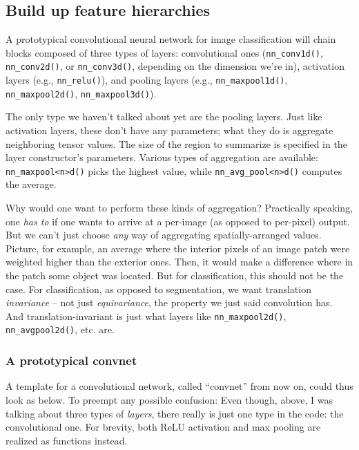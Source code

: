 \documentclass[
  letterpaper,
]{krantz}
\begin{document}
\hypertarget{build-up-feature-hierarchies}{%
\subsection{\texorpdfstring{Build up feature
hierarchies}{Build up feature hierarchies}}\label{build-up-feature-hierarchies}}

A prototypical convolutional neural network for image classification
will chain blocks composed of three types of layers: convolutional ones
(\texttt{nn\_conv1d()}, \texttt{nn\_conv2d()}, or \texttt{nn\_conv3d()},
depending on the dimension we're in), activation layers (e.g.,
\texttt{nn\_relu()}), and pooling layers (e.g.,
\texttt{nn\_maxpool1d()}, \texttt{nn\_maxpool2d()},
\texttt{nn\_maxpool3d()}).

The only type we haven't talked about yet are the pooling
layers. Just like activation layers, these don't have any parameters;
what they do is aggregate neighboring tensor values. The size of the
region to summarize is specified in the layer constructor's parameters.
Various types of aggregation are available:
\texttt{nn\_maxpool\textless{}n\textgreater{}d()} picks the highest
value, while \texttt{nn\_avg\_pool\textless{}n\textgreater{}d()}
computes the average.

Why would one want to perform these kinds of aggregation? Practically
speaking, one \emph{has to} if one wants to arrive at a per-image (as
opposed to per-pixel) output. But we can't just choose \emph{any} way of
aggregating spatially-arranged values. Picture, for example, an average
where the interior pixels of an image patch were weighted higher than
the exterior ones. Then, it would make a difference where in the patch
some object was located. But for classification, this should not be the
case. For classification, as opposed to segmentation, we want
translation \emph{invariance} -- not just \emph{equivariance}, the
property we just said convolution has. And translation-invariant is just
what layers like \texttt{nn\_maxpool2d()}, \texttt{nn\_avgpool2d()},
etc. are.

\hypertarget{a-prototypical-convnet}{%
\subsubsection{A prototypical convnet}\label{a-prototypical-convnet}}

A template for a convolutional network, called ``convnet'' from now on,
could thus look as below. To preempt any possible confusion: Even
though, above, I was talking about three types of \emph{layers}, there
really is just one type in the code: the convolutional one. For brevity,
both ReLU activation and max pooling are realized as functions instead.
\end{document}
